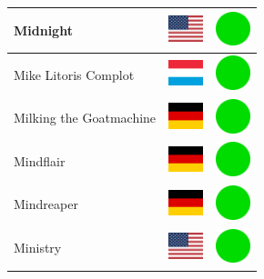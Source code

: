 \documentclass[12pt, a4paper, twoside]{report}
\begin{document}
\begin{center}
\begin{longtable}{|p{5cm}|p{2cm}|p{2cm}|}
 Midnight                                                   & \includegraphics[width=1cm]{4x3/us} &   \includegraphics[width=1cm]{likes/y} \\ \hline
 Mike Litoris Complot                                       & \includegraphics[width=1cm]{4x3/lu} &   \includegraphics[width=1cm]{likes/y} \\ \hline
 Milking the Goatmachine                                    & \includegraphics[width=1cm]{4x3/de} &   \includegraphics[width=1cm]{likes/y} \\ \hline
 Mindflair                                                  & \includegraphics[width=1cm]{4x3/de} &   \includegraphics[width=1cm]{likes/y} \\ \hline
 Mindreaper                                                 & \includegraphics[width=1cm]{4x3/de} &   \includegraphics[width=1cm]{likes/y} \\ \hline
 Ministry                                                   & \includegraphics[width=1cm]{4x3/us} &   \includegraphics[width=1cm]{likes/y} \\ \hline

\end{longtable}
\end{center}
\end{document}
